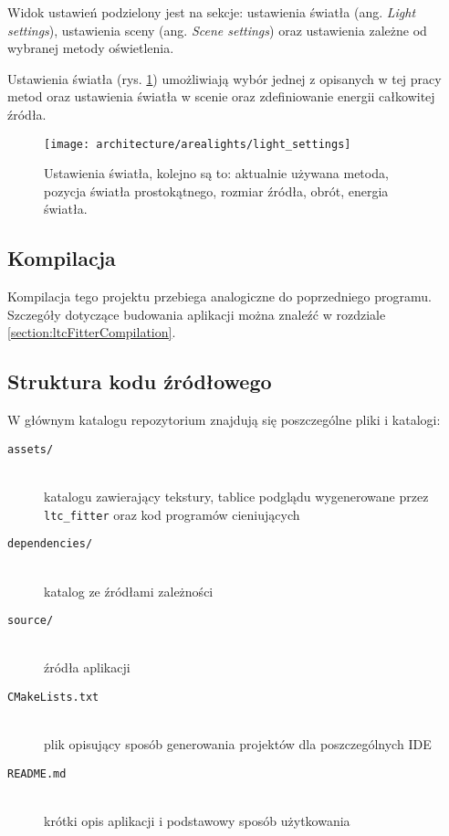 \documentclass[../main.tex]{subfiles}
\begin{document}
Widok ustawień podzielony jest na sekcje: ustawienia światła (ang. \textit{Light settings}), ustawienia sceny (ang. \textit{Scene settings}) oraz ustawienia zależne od wybranej metody oświetlenia.

Ustawienia światła (rys. \ref{fig:app_arealights_light_settings}) umożliwiają wybór jednej z opisanych w tej pracy metod oraz ustawienia światła w scenie oraz zdefiniowanie energii całkowitej źródła.

\begin{figure}[h]
    \centering
    \texttt{[image: architecture/arealights/light\_settings]}
    \caption{Ustawienia światła, kolejno są to: aktualnie używana metoda, pozycja światła prostokątnego, rozmiar źródła, obrót, energia światła.}
    \label{fig:app_arealights_light_settings}
\end{figure}

\subsection{Kompilacja}

Kompilacja tego projektu przebiega analogiczne do poprzedniego programu. Szczegóły dotyczące budowania aplikacji można znaleźć w rozdziale \ref{section:ltcFitterCompilation}.

\subsection{Struktura kodu źródłowego}

W głównym katalogu repozytorium znajdują się poszczególne pliki i katalogi:

\begin{description}
    \item[\texttt{assets/}] \hfill \\ 
    katalogu zawierający tekstury, tablice podglądu wygenerowane przez \texttt{ltc\_fitter} oraz kod programów cieniujących
    
    \item[\texttt{dependencies/}] \hfill \\ 
    katalog ze źródłami zależności
    
    \item[\texttt{source/}] \hfill \\ źródła aplikacji
    
    \item[\texttt{CMakeLists.txt}] \hfill\\ 
    plik opisujący sposób generowania projektów dla poszczególnych IDE 

    \item[\texttt{README.md}] \hfill\\ 
    krótki opis aplikacji i podstawowy sposób użytkowania 
    
\end{description}
\end{document}
